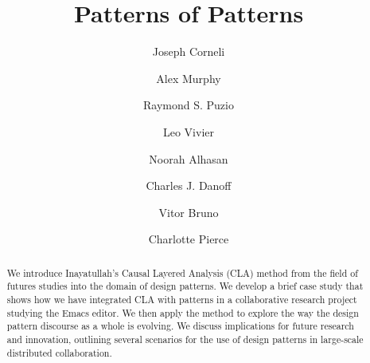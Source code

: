 \title{Patterns of Patterns}

\author{Joseph Corneli}
\author{Alex Murphy}

\author{Raymond S. Puzio}
\authornotemark[1]
\author{Leo Vivier}

\author{Noorah Alhasan}

\author{Charles J. Danoff}

\author{Vitor Bruno}


\author{Charlotte Pierce}

\renewcommand{\shortauthors}{Corneli et al.}



\begin{abstract}
We introduce Inayatullah's Causal Layered Analysis (CLA) method from
the field of futures studies into the domain of design patterns.  We
develop a brief case study that shows how we have integrated CLA with
patterns in a collaborative research project studying the Emacs
editor.  We then apply the method to explore the way the design
pattern discourse as a whole is evolving.  We discuss implications for
future research and innovation, outlining several scenarios for the
use of design patterns in large-scale distributed collaboration.
\end{abstract}

